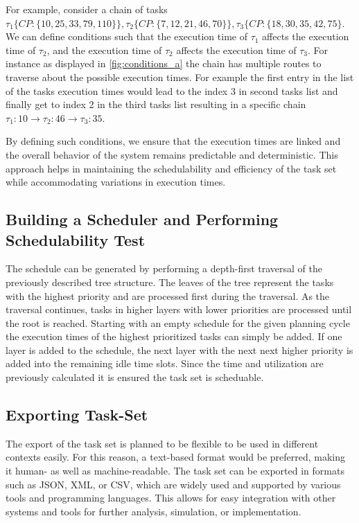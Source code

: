 For example, consider a chain of tasks \( \tau_1 \{ CP: \{10,25,33,79,110\}\}, \tau_2 \{ CP: \{7,12,21,46,70\}\}, \tau_3 \{CP: \{18,30,35,42,75\} \).
We can define conditions such that the execution time of \( \tau_1 \) affects the execution time of \( \tau_2 \), and the execution time of \( \tau_2 \) affects the execution time of \( \tau_3 \). 
For instance as displayed in \cref{fig:conditions_a} the chain has multiple routes to traverse about the possible execution times.
For example the first entry in the list of the tasks execution times would lead to the index 3 in second tasks list and finally get to index 2 in the third tasks list resulting in a specific chain \( \tau_1: 10 \rightarrow \tau_2: 46 \rightarrow \tau_3: 35 \).

By defining such conditions, we ensure that the execution times are linked and the overall behavior of the system remains predictable and deterministic. 
This approach helps in maintaining the schedulability and efficiency of the task set while accommodating variations in execution times.


\subsection{Building a Scheduler and Performing Schedulability Test}\label{sec:concept_scheduler}
The schedule can be generated by performing a depth-first traversal of the previously described tree structure.
The leaves of the tree represent the tasks with the highest priority and are processed first during the traversal.
As the traversal continues, tasks in higher layers with lower priorities are processed until the root is reached.
Starting with an empty schedule for the given planning cycle the execution times of the highest prioritized tasks can simply be added.
If one layer is added to the schedule, the next layer with the next next higher priority is added into the remaining idle time slots.
Since the time and utilization are previously calculated it is ensured the task set is scheduable.




\subsection{Exporting Task-Set}\label{sec:exporting_task_set}
The export of the task set is planned to be flexible to be used in different contexts easily.
For this reason, a text-based format would be preferred, making it human- as well as machine-readable.
The task set can be exported in formats such as JSON, XML, or CSV, which are widely used and supported by various tools and programming languages.
This allows for easy integration with other systems and tools for further analysis, simulation, or implementation.

